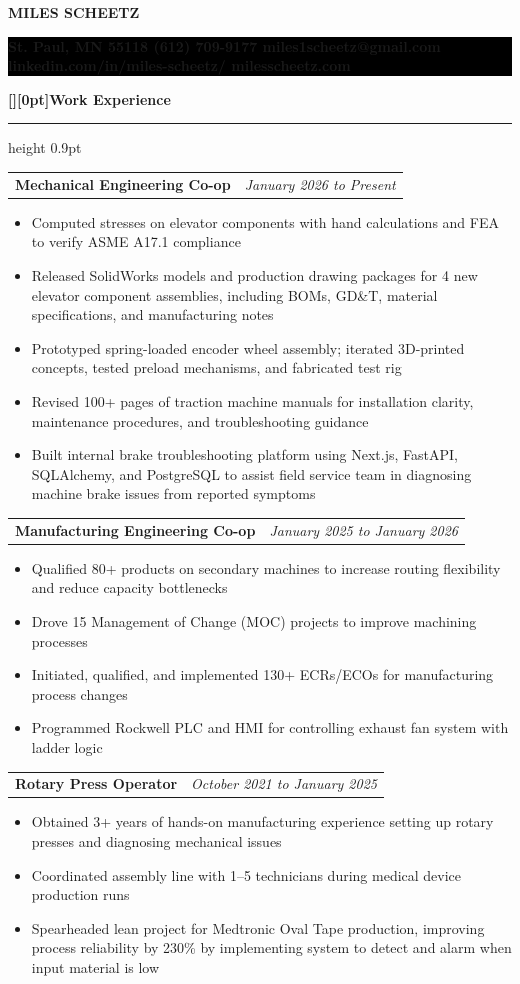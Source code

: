 \documentclass[10pt,letterpaper]{article}
\makeatletter
\newcommand{\name}[1]{%
  \begin{center}
    {\fontsize{29}{31}\selectfont\bfseries #1}
  \end{center}
  \vspace{-0.28em}
}
\newcommand{\contact}[1]{%
  \colorbox{black}{%
    \parbox[c][22pt][c]{\linewidth}{%
      \centering\color{white}\fontsize{10}{12}\selectfont\bfseries #1%
    }%
  }%
  \vspace{0.36em}
}
\newcommand{\sectionheading}[1]{%
  \vspace{0.5em}
  {\fontsize{14}{15}\selectfont\bfseries\raisebox{0pt}[\height][0pt]{#1}}\par
  \vspace{0.4em}%
  \hrule height 0.9pt
  \vspace{0.24em}
}
\newcommand{\entrytitle}[2]{%
  \begin{tabular*}{\linewidth}{@{}l@{\extracolsep{\fill}}r@{}}
    {\fontsize{10}{12}\selectfont\bfseries #1} &
    {\fontsize{10}{12}\selectfont\itshape #2} \\
  \end{tabular*}
  \vspace{-0.13em}
}
\newcommand{\tightbullets}{%
  \begin{itemize}[
    leftmargin=1.52em,
    label=\raisebox{0.1ex}{\footnotesize\textbullet},
    itemsep=0pt,
    topsep=0pt,
    parsep=0pt,
    partopsep=0pt
  ]
}
\newcommand{\closetightbullets}{\end{itemize}\vspace{-0.03em}}
\makeatother
\begin{document}
\name{MILES SCHEETZ}
\contact{St. Paul, MN 55118 \textbar{} (612) 709-9177 \textbar{} miles1scheetz@gmail.com \textbar{} linkedin.com/in/miles-scheetz/ \textbar{} milesscheetz.com}

\sectionheading{Work Experience}

\entrytitle{Mechanical Engineering Co-op}{January 2026 to Present}
\tightbullets
  \item Computed stresses on elevator components with hand calculations and FEA to verify ASME A17.1 compliance
  \item Released SolidWorks models and production drawing packages for 4 new elevator component assemblies, including BOMs, GD\&T, material specifications, and manufacturing notes
  \item Prototyped spring-loaded encoder wheel assembly; iterated 3D-printed concepts, tested preload mechanisms, and fabricated test rig
  \item Revised 100+ pages of traction machine manuals for installation clarity, maintenance procedures, and troubleshooting guidance
  \item Built internal brake troubleshooting platform using Next.js, FastAPI, SQLAlchemy, and PostgreSQL to assist field service team in diagnosing machine brake issues from reported symptoms
\closetightbullets

\entrytitle{Manufacturing Engineering Co-op}{January 2025 to January 2026}
\tightbullets
  \item Qualified 80+ products on secondary machines to increase routing flexibility and reduce capacity bottlenecks
  \item Drove 15 Management of Change (MOC) projects to improve machining processes
  \item Initiated, qualified, and implemented 130+ ECRs/ECOs for manufacturing process changes
  \item Programmed Rockwell PLC and HMI for controlling exhaust fan system with ladder logic
\closetightbullets

\entrytitle{Rotary Press Operator}{October 2021 to January 2025}
\tightbullets
  \item Obtained 3+ years of hands-on manufacturing experience setting up rotary presses and diagnosing mechanical issues
  \item Coordinated assembly line with 1--5 technicians during medical device production runs
  \item Spearheaded lean project for Medtronic Oval Tape production, improving process reliability by 230\% by implementing system to detect and alarm when input material is low
\closetightbullets
\end{document}
